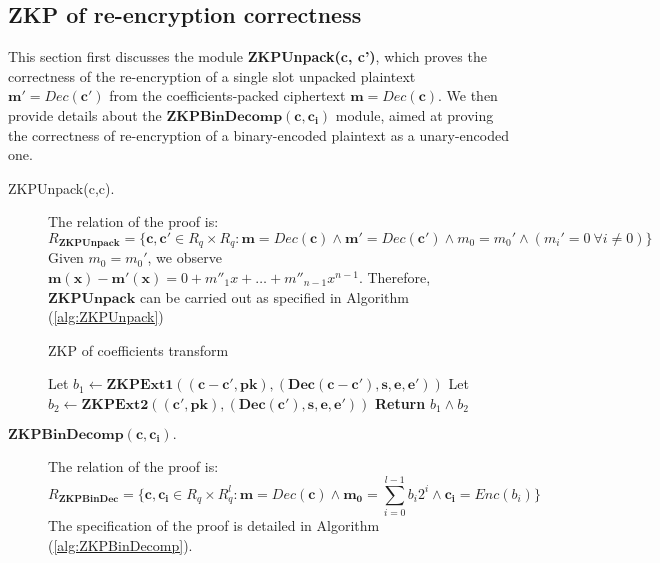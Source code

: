 \subsection{ZKP of re-encryption correctness}
\label{sec:ZKPReencrypt}
This section first discusses the module \textbf{ZKPUnpack(c, c')}, which proves the
correctness of the re-encryption of a single slot unpacked plaintext $\mathbf{m'} = Dec(\mathbf{c'})$ from the
coefficients-packed ciphertext $\mathbf{m} = Dec(\mathbf{c})$.
We then provide details about the $\mathbf{ZKPBinDecomp(c,c_i)}$ module, aimed at proving the correctness of re-encryption of a binary-encoded plaintext as a unary-encoded one.
\begin{description}
\item [{ZKPUnpack(c,c).}]The relation of the proof is:
  \[
    R_{\mathbf{ZKPUnpack}} = \{ \mathbf{c, c'} \in R_q \times R_q :
    \mathbf{m} = Dec(\mathbf{c}) \land \mathbf{m'} = Dec(\mathbf{c'}) \land m_0
    = m_0' \land (m_i' = 0 \  \forall i \neq 0)\}
  \]
  Given $m_0 = m_0'$, we observe $\mathbf{m(x) - m'(x)} = 0 + m''_1x + \dots + m''_{n-1}x^{n-1}$. Therefore, $\mathbf{ZKPUnpack}$
  can be carried out as specified in Algorithm (\ref{alg:ZKPUnpack})

  \begin{algorithm}
    \caption{ZKP of coefficients transform}\label{alg:ZKPUnpack}
    \begin{algorithmic}[1]
      \State Let $b_1 \gets \mathbf{ZKPExt1((c-c',pk),(Dec(c-c'), s, e, e'))}$
      \State Let $b_2 \gets \mathbf{ZKPExt2((c',pk),(Dec(c'),s,e,e'))}$
      \State \textbf{Return} $b_1 \land b_2$
      \EndProcedure
    \end{algorithmic}
  \end{algorithm}

\item [$\mathbf{ZKPBinDecomp(c,c_i).}$] The relation of the proof is:
  \[
    R_{\mathbf{ZKPBinDec}} = \{ \mathbf{c,c_i} \in R_q \times R_q^l:
    \mathbf{m} = Dec(\mathbf{c}) \land \mathbf{m_0} = \sum_{i=0}^{l-1}b_i2^i
    \land \mathbf{c_i} = Enc(b_i)
    \}
  \]
  The specification of the proof is detailed in Algorithm
  (\ref{alg:ZKPBinDecomp}).


\end{description}
